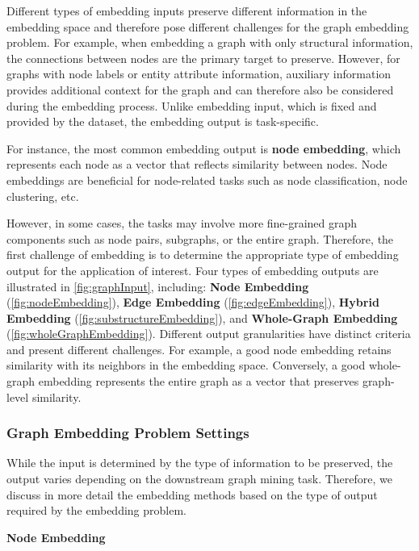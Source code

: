 Different types of embedding inputs preserve different information in the embedding space and therefore pose different challenges for the graph embedding problem. 
For example, when embedding a graph with only structural information, the connections between nodes are the primary target to preserve. However, for graphs with node labels or entity attribute information, auxiliary information provides additional context for the graph and can therefore also be considered during the embedding process. Unlike embedding input, which is fixed and provided by the dataset, the embedding output is task-specific.

For instance, the most common embedding output is \textbf{node embedding}, which represents each node as a vector that reflects similarity between nodes. Node embeddings are beneficial for node-related tasks such as node classification, node clustering, etc.

However, in some cases, the tasks may involve more fine-grained graph components such as node pairs, subgraphs, or the entire graph. Therefore, the first challenge of embedding is to determine the appropriate type of embedding output for the application of interest. Four types of embedding outputs are illustrated in \autoref{fig:graphInput}, including: \textbf{Node Embedding} (\ref{fig:nodeEmbedding}), \textbf{Edge Embedding} (\ref{fig:edgeEmbedding}), \textbf{Hybrid Embedding} (\ref{fig:substructureEmbedding}), and \textbf{Whole-Graph Embedding} (\ref{fig:wholeGraphEmbedding}). Different output granularities have distinct criteria and present different challenges. For example, a good node embedding retains similarity with its neighbors in the embedding space. Conversely, a good whole-graph embedding represents the entire graph as a vector that preserves graph-level similarity.


\subsubsection{Graph Embedding Problem Settings}

While the input is determined by the type of information to be preserved, the output varies depending on the downstream graph mining task. Therefore, we discuss in more detail the embedding methods based on the type of output required by the embedding problem.

\textbf{Node Embedding}
\label{sec:nodeEmbedding}



